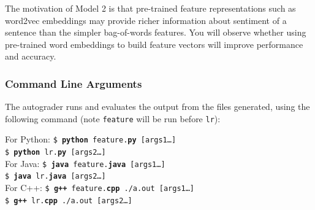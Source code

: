 \documentclass[11pt,addpoints,answers]{exam}
\begin{document}
The motivation of Model 2 is that pre-trained feature representations such as word2vec embeddings may provide richer information about sentiment of a sentence than the simpler bag-of-words features. You will observe whether using pre-trained word embeddings to build feature vectors will improve performance and accuracy.


\subsubsection{Command Line Arguments}
The autograder runs and evaluates the output from the files generated, using the following command (note \lstinline{feature} will be run before \lstinline{lr}):

\begin{tabbing}
For Python: \=\texttt{\$ \textbf{python} feature.\textbf{py} [args1\dots]}\\
\>\texttt{\$ \textbf{python} lr.\textbf{py} [args2\dots]}\\
For Java: \>\texttt{\$ \textbf{java} feature.\textbf{java} [args1\dots]}\\
\>\texttt{\$ \textbf{java} lr.\textbf{java} [args2\dots]}\\
For C++: \>\texttt{\$ \textbf{g++} feature.\textbf{cpp} ./a.out [args1\dots]}\\
\>\texttt{\$ \textbf{g++} lr.\textbf{cpp} ./a.out [args2\dots]}
\end{tabbing}
\end{document}
